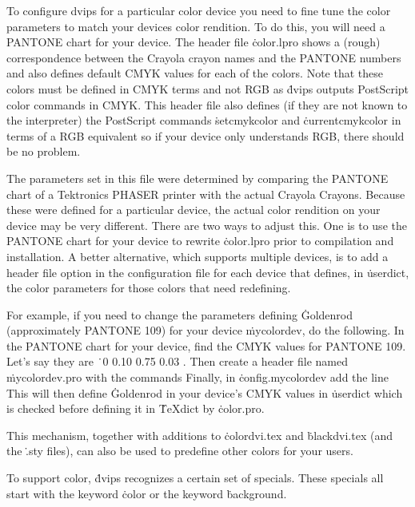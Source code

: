 
To configure dvips for a particular color device you need to fine tune
the color parameters to match your devices color rendition.  To do
this, you will need a PANTONE chart for your device.  The header file
\.{color.lpro} shows a (rough) correspondence between the Crayola
crayon names and the PANTONE numbers and also defines default CMYK
values for each of the colors.  Note that these colors must be defined
in CMYK terms and not RGB as \.{dvips} outputs PostScript color
commands in CMYK.  This header file also defines (if they are not
known to the interpreter) the PostScript commands \.{setcmykcolor} and
\.{currentcmykcolor} in terms of a RGB equivalent so if your device
only understands RGB, there should be no problem.

The parameters set in this file were determined by comparing the
PANTONE chart of a Tektronics PHASER printer with the actual Crayola
Crayons.  Because these were defined for a particular device, the
actual color rendition on your device may be very different.  There
are two ways to adjust this.  One is to use the PANTONE chart for your
device to rewrite \.{color.lpro} prior to compilation and
installation.  A better alternative, which supports multiple devices,
is to add a header file option in the configuration file for each
device that defines, in \.{userdict}, the color parameters for those
colors that need redefining.

For example, if you need to change the parameters defining
\.{Goldenrod} (approximately PANTONE 109) for your device
\.{mycolordev}, do the following.  In the PANTONE chart for your
device, find the CMYK values for PANTONE 109.  Let's say they are
\.{\ 0 0.10 0.75 0.03 }. Then create a header file
named \.{mycolordev.pro} with the commands
\noindent
Finally, in \.{config.mycolordev} add the line 
\noindent
This will then define \.{Goldenrod} in your device's CMYK values in
\.{userdict} which is checked before defining it in \.{TeXdict} by
\.{color.pro}.

This mechanism, together with additions to \.{colordvi.tex} and
\.{blackdvi.tex} (and the \.{.sty} files), can also be used to predefine
other colors for your users.


To support color, \.{dvips} recognizes a certain set of specials.
These specials all start with the keyword \.{color} or the keyword
\.{background}.

